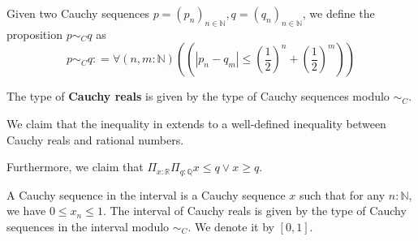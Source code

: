 
\begin{definition}
Given two Cauchy sequences $p = (p_n)_{n\in\mathbb N}, q=(q_n)_{n\in\mathbb N}$, 
we define the proposition $p \sim_C  q$ as 
\begin{equation}
  p \sim_C q : = \forall (n,m : \mathbb N) ((| p_n - q_m| \leq  (\frac12)^n + (\frac12)^m))
\end{equation}
\end{definition}


\begin{definition}
  The type of \textbf{Cauchy reals} is given by 
  the type of Cauchy sequences modulo $\sim_C$.
\end{definition}

We claim that the inequality in  extends to a well-defined 
inequality between Cauchy reals and rational numbers. 

Furthermore, we claim that 
$\Pi_{x:\mathbb R} \Pi_{q:\mathbb Q} x \leq q \vee x \geq q$. 

%

\begin{definition}
  A Cauchy sequence in the interval is a Cauchy sequence $x$ such that 
  for any $n:\mathbb N$, we have $0\leq x_n \leq 1$. 
  The interval of Cauchy reals is given by the type of Cauchy sequences in the interval 
  modulo $\sim_C$. We denote it by $[0,1]$. 
\end{definition}  

